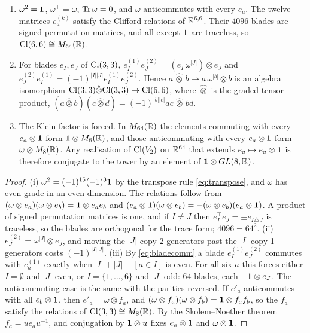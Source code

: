 \begin{proposition}
\label{d5:prop:graded}
\begin{enumerate}[label=(\roman*),leftmargin=2.2em]
\item $\omega^2=\mathbf 1$, $\omega^{\!\top}=\omega$, $\operatorname{Tr}\omega=0$, and $\omega$ anticommutes with every $e_a$. The twelve matrices $e^{(k)}_a$ satisfy
the Clifford relations of $\mathbb{R}^{6,6}$. Their $4096$ blades are signed permutation matrices, and all except $\mathbf 1$ are traceless, so
$\mathrm{Cl}(6,6)\cong M_{64}(\mathbb{R})$.
\item For blades $e_I,e_J$ of $\mathrm{Cl}(3,3)$, $e^{(1)}_Ie^{(2)}_J=(e_I\,\omega^{|J|})\otimes e_J$ and $e^{(2)}_Je^{(1)}_I=(-1)^{|I||J|}e^{(1)}_Ie^{(2)}_J$.
Hence $a\,\hat\otimes\,b\mapsto a\,\omega^{|b|}\otimes b$ is an algebra isomorphism $\mathrm{Cl}(3,3)\hat\otimes\mathrm{Cl}(3,3)\to\mathrm{Cl}(6,6)$, where $\hat\otimes$
is the graded tensor product, $(a\hat\otimes b)(c\hat\otimes d)=(-1)^{|b||c|}ac\,\hat\otimes\,bd$.
\item The Klein factor is forced. In $M_{64}(\mathbb{R})$ the elements commuting with every $e_a\otimes\mathbf 1$ form $\mathbf 1\otimes M_8(\mathbb{R})$, and those
anticommuting with every $e_a\otimes\mathbf 1$ form $\omega\otimes M_8(\mathbb{R})$. Any realisation of $\mathrm{Cl}(V_2)$ on $\mathbb{R}^{64}$ that extends
$e_a\mapsto e_a\otimes\mathbf 1$ is therefore conjugate to the tower by an element of $\mathbf 1\otimes GL(8,\mathbb{R})$.
\end{enumerate}
\end{proposition}

\begin{proof}
(i) $\omega^2=(-1)^{15}(-1)^3\mathbf 1$ by the transpose rule \cref{eq:transpose}, and $\omega$ has even grade in an even dimension. The relations
follow from $(\omega\otimes e_a)(\omega\otimes e_b)=\mathbf 1\otimes e_ae_b$ and $(e_a\otimes\mathbf 1)(\omega\otimes e_b)=-(\omega\otimes e_b)(e_a\otimes\mathbf 1)$. A product
of signed permutation matrices is one, and if $I\neq J$ then $e_I^{\!\top}e_J=\pm e_{I\triangle J}$ is traceless, so the blades are orthogonal
for the trace form; $4096=64^2$. (ii) $e^{(2)}_J=\omega^{|J|}\otimes e_J$, and moving the $|J|$ copy-2 generators past the $|I|$ copy-1
generators costs $(-1)^{|I||J|}$. (iii) By \cref{eq:bladecomm} a blade $e^{(1)}_Ie^{(2)}_J$ commutes with $e^{(1)}_a$ exactly when
$|I|+|J|-[a\in I]$ is even. For all six $a$ this forces either $I=\emptyset$ and $|J|$ even, or $I=\{1,\dots,6\}$ and $|J|$ odd: $64$ blades,
each $\pm\mathbf 1\otimes e_J$. The anticommuting case is the same with the parities reversed. If $e'_a$ anticommutes with all $e_b\otimes\mathbf 1$, then
$e'_a=\omega\otimes f_a$, and $(\omega\otimes f_a)(\omega\otimes f_b)=\mathbf 1\otimes f_af_b$, so the $f_a$ satisfy the relations of $\mathrm{Cl}(3,3)\cong M_8(\mathbb{R})$. By the
Skolem--Noether theorem $f_a=ue_au^{-1}$, and conjugation by $\mathbf 1\otimes u$ fixes $e_a\otimes\mathbf 1$ and $\omega\otimes\mathbf 1$.
\end{proof}

